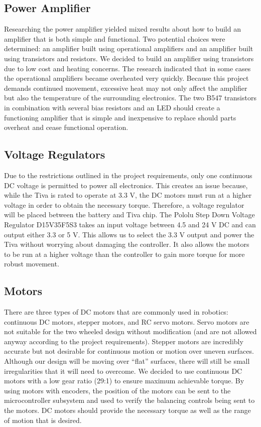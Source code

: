 \documentclass[11pt]{report}
\begin{document}
\begin{spacing}{1.5}
\subsection*{Power Amplifier}

Researching the power amplifier yielded mixed results about how to build an amplifier that is both simple and functional. Two potential choices were determined: an amplifier built using operational amplifiers and an amplifier built using transistors and resistors. We decided to build an amplifier using transistors due to low cost and heating concerns.  The research indicated that in some cases the operational amplifiers became overheated very quickly. Because this project demands continued movement, excessive heat may not only affect the amplifier but also the temperature of the surrounding electronics. The two B547 transistors in combination with several bias resistors and an LED should create a functioning amplifier that is simple and inexpensive to replace should parts overheat and cease functional operation.

\subsection*{Voltage Regulators}

Due to the restrictions outlined in the project requirements, only one continuous DC voltage is permitted to power all electronics. This creates an issue because, while the Tiva is rated to operate at 3.3 V, the DC motors must run at a higher voltage in order to obtain the necessary torque. Therefore, a voltage regulator will be placed between the battery and Tiva chip. The Pololu Step Down Voltage Regulator D15V35F5S3 takes an input voltage between 4.5 and 24 V DC and can output either 3.3 or 5 V. This allows us to select the 3.3 V output and power the Tiva without worrying about damaging the controller. It also allows the motors to be run at a higher voltage than the controller to gain more torque for more robust movement. 

\subsection*{Motors}

There are three types of DC motors that are commonly used in robotics: continuous DC motors, stepper motors, and RC servo motors. Servo motors are not suitable for the two wheeled design without modification (and are not allowed anyway according to the project requirements). Stepper motors are incredibly accurate but not desirable for continuous motion or motion over uneven surfaces. Although our design will be moving over “flat” surfaces, there will still be small irregularities that it will need to overcome. We decided to use continuous DC motors with a low gear ratio (29:1) to ensure maximum achievable torque. By using motors with encoders, the position of the motors can be sent to the microcontroller subsystem and used to verify the balancing controls being sent to the motors. DC motors should provide the necessary torque as well as the range of motion that is desired.


\end{spacing}
\end{document}
